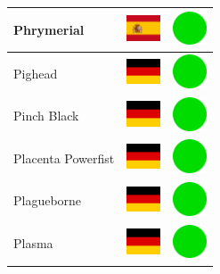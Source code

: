 \documentclass[12pt, a4paper, twoside]{report}
\begin{document}
\begin{center}
\begin{longtable}{|p{5cm}|p{2cm}|p{2cm}|}
Phrymerial & \includegraphics[width=1cm]{4x3/es} & \includegraphics[width=1cm]{likes/y} \\ \hline
Pighead & \includegraphics[width=1cm]{4x3/de} & \includegraphics[width=1cm]{likes/y} \\ \hline
Pinch Black & \includegraphics[width=1cm]{4x3/de} & \includegraphics[width=1cm]{likes/y} \\ \hline
Placenta Powerfist & \includegraphics[width=1cm]{4x3/de} & \includegraphics[width=1cm]{likes/y} \\ \hline
Plagueborne & \includegraphics[width=1cm]{4x3/de} & \includegraphics[width=1cm]{likes/y} \\ \hline
Plasma & \includegraphics[width=1cm]{4x3/de} & \includegraphics[width=1cm]{likes/y} \\ \hline

\end{longtable}
\end{center}
\end{document}
